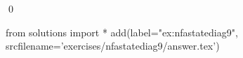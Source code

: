 
\begin{ex} 
  \label{ex:nfastatediag9}
  
  \qed
\end{ex} 
\begin{python0}
from solutions import *
add(label="ex:nfastatediag9",
    srcfilename='exercises/nfastatediag9/answer.tex') 
\end{python0}
